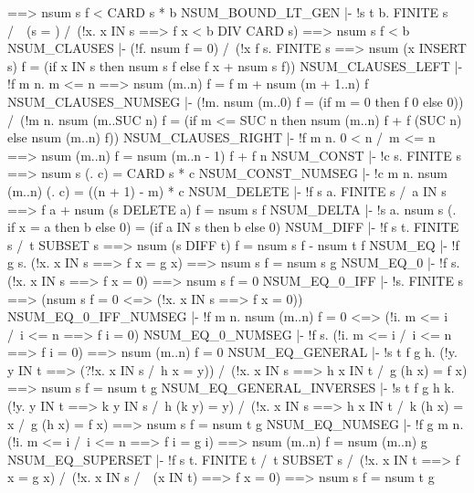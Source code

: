         ==> nsum s f < CARD s * b
\ENDTHEOREM
\THEOREM NSUM\_BOUND\_LT\_GEN
  |- !s t b.
         FINITE s /\ ~(s = {}) /\ (!x. x IN s ==> f x < b DIV CARD s)
         ==> nsum s f < b
\ENDTHEOREM
\THEOREM NSUM\_CLAUSES
  |- (!f. nsum {} f = 0) /\
     (!x f s.
          FINITE s
          ==> nsum (x INSERT s) f =
              (if x IN s then nsum s f else f x + nsum s f))
\ENDTHEOREM
\THEOREM NSUM\_CLAUSES\_LEFT
  |- !f m n. m <= n ==> nsum (m..n) f = f m + nsum (m + 1..n) f
\ENDTHEOREM
\THEOREM NSUM\_CLAUSES\_NUMSEG
  |- (!m. nsum (m..0) f = (if m = 0 then f 0 else 0)) /\
     (!m n.
          nsum (m..SUC n) f =
          (if m <= SUC n then nsum (m..n) f + f (SUC n) else nsum (m..n) f))
\ENDTHEOREM
\THEOREM NSUM\_CLAUSES\_RIGHT
  |- !f m n. 0 < n /\ m <= n ==> nsum (m..n) f = nsum (m..n - 1) f + f n
\ENDTHEOREM
\THEOREM NSUM\_CONST
  |- !c s. FINITE s ==> nsum s (\n. c) = CARD s * c
\ENDTHEOREM
\THEOREM NSUM\_CONST\_NUMSEG
  |- !c m n. nsum (m..n) (\n. c) = ((n + 1) - m) * c
\ENDTHEOREM
\THEOREM NSUM\_DELETE
  |- !f s a. FINITE s /\ a IN s ==> f a + nsum (s DELETE a) f = nsum s f
\ENDTHEOREM
\THEOREM NSUM\_DELTA
  |- !s a. nsum s (\x. if x = a then b else 0) = (if a IN s then b else 0)
\ENDTHEOREM
\THEOREM NSUM\_DIFF
  |- !f s t.
         FINITE s /\ t SUBSET s ==> nsum (s DIFF t) f = nsum s f - nsum t f
\ENDTHEOREM
\THEOREM NSUM\_EQ
  |- !f g s. (!x. x IN s ==> f x = g x) ==> nsum s f = nsum s g
\ENDTHEOREM
\THEOREM NSUM\_EQ\_0
  |- !f s. (!x. x IN s ==> f x = 0) ==> nsum s f = 0
\ENDTHEOREM
\THEOREM NSUM\_EQ\_0\_IFF
  |- !s. FINITE s ==> (nsum s f = 0 <=> (!x. x IN s ==> f x = 0))
\ENDTHEOREM
\THEOREM NSUM\_EQ\_0\_IFF\_NUMSEG
  |- !f m n. nsum (m..n) f = 0 <=> (!i. m <= i /\ i <= n ==> f i = 0)
\ENDTHEOREM
\THEOREM NSUM\_EQ\_0\_NUMSEG
  |- !f s. (!i. m <= i /\ i <= n ==> f i = 0) ==> nsum (m..n) f = 0
\ENDTHEOREM
\THEOREM NSUM\_EQ\_GENERAL
  |- !s t f g h.
         (!y. y IN t ==> (?!x. x IN s /\ h x = y)) /\
         (!x. x IN s ==> h x IN t /\ g (h x) = f x)
         ==> nsum s f = nsum t g
\ENDTHEOREM
\THEOREM NSUM\_EQ\_GENERAL\_INVERSES
  |- !s t f g h k.
         (!y. y IN t ==> k y IN s /\ h (k y) = y) /\
         (!x. x IN s ==> h x IN t /\ k (h x) = x /\ g (h x) = f x)
         ==> nsum s f = nsum t g
\ENDTHEOREM
\THEOREM NSUM\_EQ\_NUMSEG
  |- !f g m n.
         (!i. m <= i /\ i <= n ==> f i = g i)
         ==> nsum (m..n) f = nsum (m..n) g
\ENDTHEOREM
\THEOREM NSUM\_EQ\_SUPERSET
  |- !f s t.
         FINITE t /\
         t SUBSET s /\
         (!x. x IN t ==> f x = g x) /\
         (!x. x IN s /\ ~(x IN t) ==> f x = 0)
         ==> nsum s f = nsum t g
